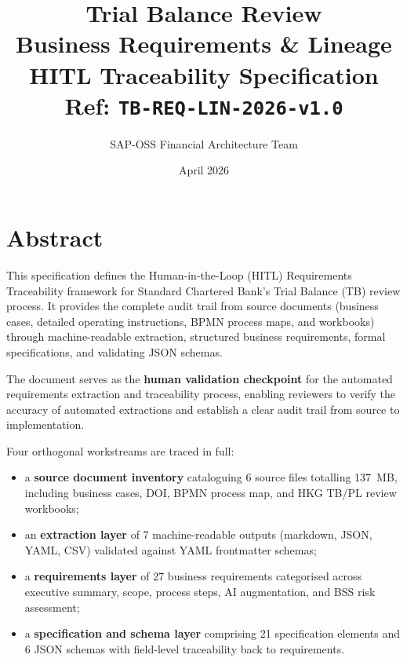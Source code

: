 \documentclass[11pt,a4paper,twoside]{report}
\begin{document}
\title{\Huge Trial Balance Review \\
\textbf{Business Requirements \& Lineage} \\
\large HITL Traceability Specification \\
\small Ref: \texttt{TB-REQ-LIN-2026-v1.0}}
\author{SAP-OSS Financial Architecture Team}
\date{April 2026}

\maketitle


\chapter*{Abstract}

This specification defines the Human-in-the-Loop (HITL) Requirements
Traceability framework for Standard Chartered Bank's Trial Balance (TB)
review process. It provides the complete audit trail from source documents
(business cases, detailed operating instructions, BPMN process maps, and
workbooks) through machine-readable extraction, structured business
requirements, formal specifications, and validating JSON schemas.

The document serves as the \textbf{human validation checkpoint} for the
automated requirements extraction and traceability process, enabling
reviewers to verify the accuracy of automated extractions and establish
a clear audit trail from source to implementation.

Four orthogonal workstreams are traced in full:

\begin{itemize}
\item a \textbf{source document inventory} cataloguing 6 source files
totalling 137~MB, including business cases, DOI, BPMN process map,
and HKG TB/PL review workbooks;
\item an \textbf{extraction layer} of 7 machine-readable outputs
(markdown, JSON, YAML, CSV) validated against YAML frontmatter
schemas;
\item a \textbf{requirements layer} of 27 business requirements
categorised across executive summary, scope, process steps,
AI augmentation, and BSS risk assessment;
\item a \textbf{specification and schema layer} comprising 21
specification elements and 6 JSON schemas with field-level
traceability back to requirements.
\end{itemize}
\end{document}
